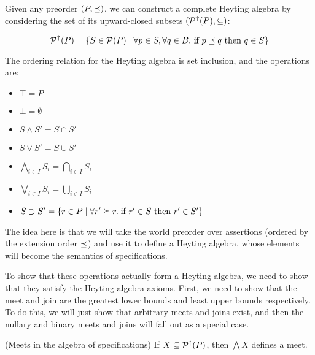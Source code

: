 Given any preorder $(P, \preceq)$, we can construct a complete
Heyting algebra by considering the set of its upward-closed subsets
$(\mathcal{P}^{\uparrow}({P}), \subseteq)$:

\begin{displaymath}
\mathcal{P}^{\uparrow}({P}) = 
  \{ S \in \mathcal{P}(P) \;|\;
     \forall p \in S, \forall q \in B. \mbox{ if } p \preceq q \mbox{ then } q \in S 
  \}
\end{displaymath}

The ordering relation for the Heyting algebra is set inclusion, and
the operations are:

\begin{itemize}
\item $\top = P$
\item $\bot = \emptyset$
\item $S \land S' = S \cap S'$
\item $S \vee S' = S \cup S'$
\item $\bigwedge_{i \in I} S_i = \bigcap_{i \in I} S_i$
\item $\bigvee_{i \in I} S_i = \bigcup_{i \in I} S_i$
\item $S \supset S' = \{ r \in P \;|\; \forall r' \succeq r.\; 	
                          \mbox{if } r' \in S \mbox{ then } r' \in S' \}$
\end{itemize}

The idea here is that we will take the world preorder over assertions
(ordered by the extension order $\preceq$) and use it to define a 
Heyting algebra, whose elements will become the semantics of specifications.


To show that these operations actually form a Heyting algebra, we need
to show that they satisfy the Heyting algebra axioms. First, we need
to show that the meet and join are the greatest lower bounds and least
upper bounds respectively. To do this, we will just show that arbitrary
meets and joins exist, and then the nullary and binary meets and joins
will fall out as a special case.

\begin{lemma}{(Meets in the algebra of specifications)}
If $X \subseteq \mathcal{P}^{\uparrow}({P})$, then $\bigwedge X$ defines a meet. 
\end{lemma}


